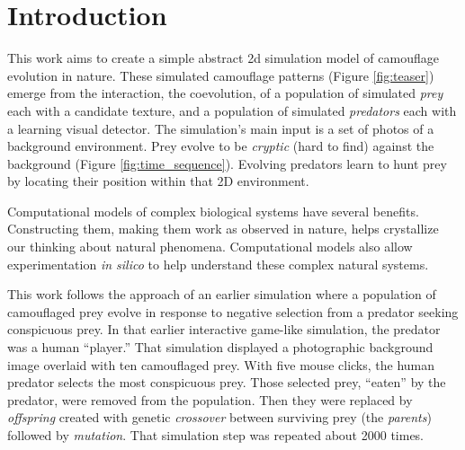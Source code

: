 \documentclass[letterpaper]{article}
\newcommand{\jargon}[1]{\textit{#1}}
\begin{document}



\section{Introduction}

This work aims to create a simple abstract 2d simulation model of camouflage evolution in nature. These simulated camouflage patterns (Figure \ref{fig:teaser}) emerge from the interaction, the coevolution, of a population of simulated \jargon{prey} each with a candidate texture, and a population of simulated \jargon{predators} each with a learning visual detector. The simulation's main input is a set of photos of a background environment. Prey evolve to be \jargon{cryptic} (hard to find) against the background (Figure \ref{fig:time_sequence}). Evolving predators learn to hunt prey by locating their position within that 2D environment.
\par
Computational models of complex biological systems have several benefits. Constructing them, making them work as observed in nature, helps crystallize our thinking about natural phenomena. Computational models also allow experimentation \textit{in silico} to help understand these complex natural systems.
\par
This work follows the approach of an earlier simulation \citep{reynolds_iec_2011} where a population of camouflaged prey evolve in response to negative selection from a predator seeking conspicuous prey. In that earlier interactive game-like simulation, the predator was a human ``player.'' That simulation displayed a photographic background image overlaid with ten camouflaged prey. With five mouse clicks, the human predator selects the most conspicuous prey. Those selected prey, ``eaten'' by the predator, were removed from the population. Then they were replaced by \jargon{offspring} created with genetic \jargon{crossover} between surviving prey (the \jargon{parents}) followed by \jargon{mutation}. That simulation step was repeated about 2000 times.
\par


\end{document}
